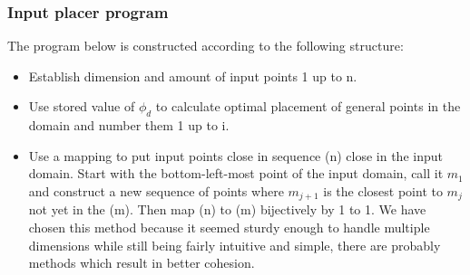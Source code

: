 \subsubsection{Input placer program}
The program below is constructed according to the following structure:
\begin{itemize}
    \item Establish dimension and amount of input points 1 up to n.\
    \item Use stored value of $\phi_d$ to calculate optimal placement of general points in the domain and number them 1 up to i.\ 
    \item Use a mapping to put input points close in sequence (n) close in the input domain. Start with the bottom-left-most point of the input domain, call it $m_1$ and construct a new sequence of points where $m_{j+1}$ is the closest point to $m_{j}$ not yet in the (m). Then map (n) to (m) bijectively by 1 to 1. We have chosen this method because it seemed sturdy enough to handle multiple dimensions while still being fairly intuitive and simple, there are probably methods which result in better cohesion.\
\end{itemize}
